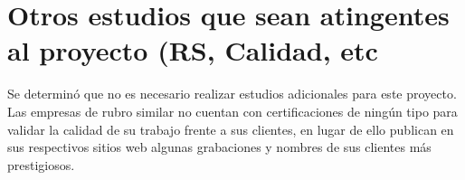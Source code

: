 \section{Otros estudios que sean atingentes al proyecto (RS, Calidad, etc}
	Se determinó que no es necesario realizar estudios adicionales para este proyecto.
    Las empresas de rubro similar no cuentan con certificaciones de ningún tipo para
    validar la calidad de su trabajo frente a sus clientes, en lugar de ello publican
    en sus respectivos sitios web algunas grabaciones y nombres de sus clientes más prestigiosos. 
